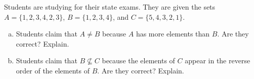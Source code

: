 \documentclass[11pt,letterpaper]{article}
\begin{document}
\newpage



 Students are studying for their state exams. They are given the sets $A= \{ 1, 2, 3, 4, 2, 3 \}$, $B= \{ 1, 2, 3, 4 \}$, and $C= \{ 5, 4, 3, 2, 1 \}$. 
	\begin{enumerate}[(a)]
	\item Students claim that $A \neq B$ because $A$ has more elements than $B$. Are they correct? Explain. 
	\item Students claim that $B \not\subseteq C$ because the elements of $C$ appear in the reverse order of the elements of $B$. Are they correct? Explain. 
	\end{enumerate}
\end{document}
